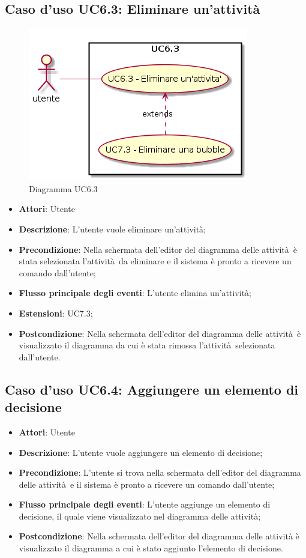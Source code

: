 \documentclass[../AnalisiDeiRequisiti.tex]{subfiles}
\begin{document}
				\subsection{Caso d'uso UC6.3: Eliminare un'attività}
				\begin{figure} [H]
					\centering
					\includegraphics[scale=0.45]{./Figures/UC6_3.png}
					\caption{Diagramma UC6.3}\label{}
				\end{figure}
				\begin{itemize}
					\item \textbf{Attori}: Utente
					\item \textbf{Descrizione}: L'utente vuole eliminare un'attività;
					\item \textbf{Precondizione}: Nella schermata dell'editor del diagramma delle attività è stata selezionata l'attività da eliminare e il sistema è pronto a ricevere un comando dall'utente;
					\item \textbf{Flusso principale degli eventi}: L'utente elimina un'attività;
					\item \textbf{Estensioni}: UC7.3;
					\item \textbf{Postcondizione}: Nella schermata dell'editor del diagramma delle attività è visualizzato il diagramma da cui è stata rimossa l'attività selezionata dall'utente.
				\end{itemize}
				\subsection{Caso d'uso UC6.4: Aggiungere un elemento di decisione}
				\begin{itemize}
					\item \textbf{Attori}: Utente
					\item \textbf{Descrizione}: L'utente vuole aggiungere un elemento di decisione;
					\item \textbf{Precondizione}: L'utente si trova nella schermata dell'editor del diagramma delle attività e il sistema è pronto a ricevere un comando dall'utente;
					\item \textbf{Flusso principale degli eventi}: L'utente aggiunge un elemento di decisione, il quale viene visualizzato nel diagramma delle attività;
					\item \textbf{Postcondizione}: Nella schermata dell'editor del diagramma delle attività è visualizzato il diagramma a cui è stato aggiunto l'elemento di decisione.
				\end{itemize}
\end{document}
